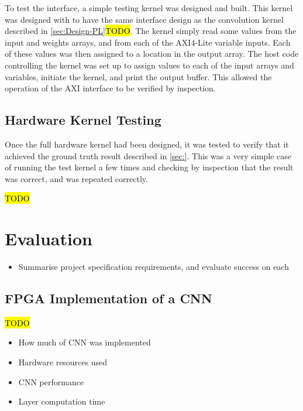 \documentclass[12pt]{article}
\begin{document}
To test the interface, a simple testing kernel was designed and built. This kernel was designed with to have the same interface design as the convolution kernel described in \ref{sec:Design-PL}\hl{TODO}. The kernel simply read some values from the input and weights arrays, and from each of the AXI4-Lite variable inputs. Each of these values was then assigned to a location in the output array. The host code controlling the kernel was set up to assign values to each of the input arrays and variables, initiate the kernel, and print the output buffer. This allowed the operation of the AXI interface to be verified by inspection.

\subsection{Hardware Kernel Testing}
\label{sec:Test-HW}

Once the full hardware kernel had been designed, it was tested to verify that it achieved the ground truth result described in \ref{sec:}. This was a very simple case of running the test kernel a few times and checking by inspection that the result was correct, and was repeated correctly.  

\hl{TODO}

\newpage

\section{Evaluation}
\label{sec:Eval}

\begin{itemize}
\item Summarise project specification requirements, and evaluate success on each
\end{itemize}

\subsection{FPGA Implementation of a CNN}
\label{sec:Eval-FPGAImplOfCnn}

\hl{TODO}

\begin{itemize}
\item How much of CNN was implemented
\item Hardware resources used
\item CNN performance
\item Layer computation time
\end{itemize}
\end{document}
